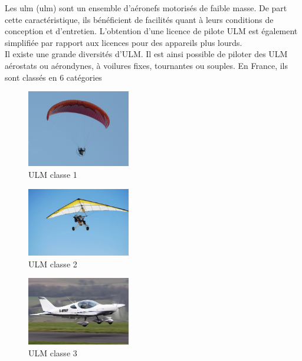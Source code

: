 Les \acrshort{ulm} (\acrlong{ulm})  sont un ensemble d'aéronefs motorisés de faible masse. De part cette caractéristique, ils bénéficient de facilités quant à leurs conditions de conception et d'entretien. L'obtention d'une licence de pilote ULM est également simplifiée par rapport aux licences pour des appareils plus lourds. \\

Il existe une grande diversités d'ULM. Il est ainsi possible de piloter des ULM aérostats ou aérondynes, à voilures fixes, tournantes ou souples. En France, ils sont classés en 6 catégories \\


	\begin{figure}[H]
  	\centering
    \includegraphics[width=0.4\textwidth]{1-EtudeAeronefs/img/ULM_Classe_1.jpg}
  	\caption{ULM classe 1 \cite{img:ulmClasse1}}
	\end{figure}	
	
	\begin{figure}[H]
  	\centering
    \includegraphics[width=0.4\textwidth]{1-EtudeAeronefs/img/ULM_Classe_2.jpg}
  	\caption{ULM classe 2 \cite{img:ulmClasse2}}
	\end{figure}	

	\begin{figure}[H]
  	\centering
    \includegraphics[width=0.4\textwidth]{1-EtudeAeronefs/img/ULM_Classe_3.jpg}
  	\caption{ULM classe 3 \cite{img:ulmClasse3}}
	\end{figure}	

